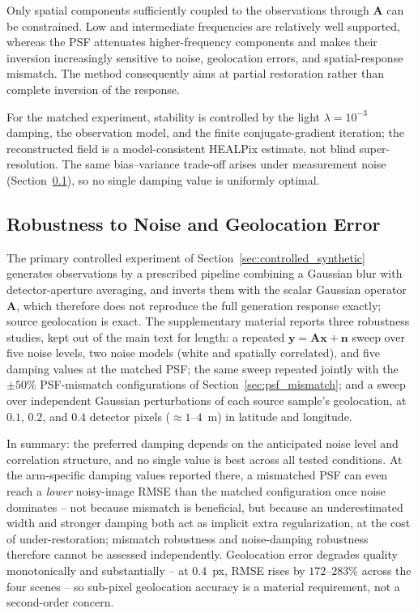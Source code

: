 \documentclass[journal]{IEEEtran}
\newcommand{\healpix}{HEALPix\xspace}
\newcommand{\psf}{PSF\xspace}
\begin{document}
Only spatial components sufficiently coupled to the observations
through $\mathbf A$ can be constrained. Low and intermediate
frequencies are relatively well supported, whereas the \psf
attenuates higher-frequency components and makes their inversion
increasingly sensitive to noise, geolocation errors, and
spatial-response mismatch. The method consequently aims at partial
restoration rather than complete inversion of the response.

For the matched experiment, stability is controlled by the light
$\lambda=10^{-3}$ damping, the observation model, and the finite
conjugate-gradient iteration; the reconstructed field is a
model-consistent \healpix estimate, not blind super-resolution.
The same bias--variance trade-off arises under measurement noise
(Section~\ref{sec:noise_robustness}), so no single damping value
is uniformly optimal.

\subsection{Robustness to Noise and Geolocation Error}
\label{sec:noise_robustness}

The primary controlled experiment of Section~\ref{sec:controlled_synthetic}
generates observations by a prescribed pipeline combining a Gaussian blur
with detector-aperture averaging, and inverts them with the scalar Gaussian
operator $\mathbf A$, which therefore does not reproduce the full generation
response exactly; source geolocation is exact. The supplementary material
reports three
robustness studies, kept out of the main text for length: a repeated
$\mathbf y=\mathbf A\mathbf x+\mathbf n$ sweep over five noise levels, two
noise models (white and spatially correlated), and five damping values at
the matched \psf; the same sweep
repeated jointly with the $\pm50\%$ \psf-mismatch configurations of
Section~\ref{sec:psf_mismatch}; and
a sweep over independent Gaussian perturbations of each source sample's
geolocation, at $0.1$, $0.2$, and $0.4$ detector pixels
($\approx1$--$4$~m) in latitude and longitude.

In summary: the preferred damping depends on the anticipated noise level
and correlation structure, and no single value is best across all tested
conditions. At the arm-specific damping values reported there, a mismatched \psf can even reach a
\emph{lower} noisy-image RMSE than the matched configuration once noise
dominates -- not because mismatch is beneficial, but because an
underestimated width and stronger damping both act as implicit extra
regularization, at the cost of under-restoration; mismatch robustness and
noise-damping robustness therefore cannot be assessed independently.
Geolocation error degrades quality monotonically and substantially -- at
$0.4$~px, RMSE rises by $172$--$283\%$ across the four scenes -- so
sub-pixel geolocation accuracy is a material requirement, not a
second-order concern.
\end{document}
